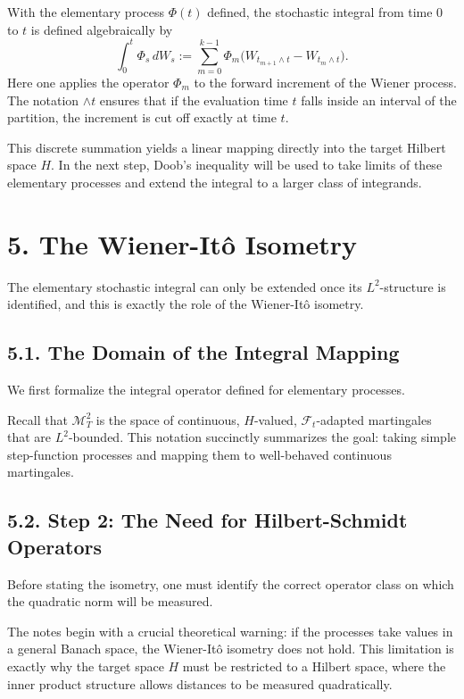 \documentclass[11pt]{article}
\theoremstyle{definition}
\theoremstyle{remark}
\begin{document}
With the elementary process \(\Phi(t)\) defined, the stochastic integral from time \(0\) to \(t\) is defined algebraically by
\[
\int_0^t \Phi_s\,dW_s
:=
\sum_{m=0}^{k-1}\Phi_m\bigl(W_{t_{m+1}\wedge t}-W_{t_m\wedge t}\bigr).
\]
Here one applies the operator \(\Phi_m\) to the forward increment of the Wiener process. The notation \(\wedge t\) ensures that if the evaluation time \(t\) falls inside an interval of the partition, the increment is cut off exactly at time \(t\).

This discrete summation yields a linear mapping directly into the target Hilbert space \(H\). In the next step, Doob's inequality will be used to take limits of these elementary processes and extend the integral to a larger class of integrands.

\section*{5. The Wiener-It\^o Isometry}
The elementary stochastic integral can only be extended once its \(L^2\)-structure is identified, and this is exactly the role of the Wiener-It\^o isometry.

\subsection*{5.1. The Domain of the Integral Mapping}
We first formalize the integral operator defined for elementary processes.

Recall that \(\mathcal M_T^2\) is the space of continuous, \(H\)-valued, \(\mathcal F_t\)-adapted martingales that are \(L^2\)-bounded. This notation succinctly summarizes the goal: taking simple step-function processes and mapping them to well-behaved continuous martingales.

\subsection*{5.2. Step 2: The Need for Hilbert-Schmidt Operators}
Before stating the isometry, one must identify the correct operator class on which the quadratic norm will be measured.

The notes begin with a crucial theoretical warning: if the processes take values in a general Banach space, the Wiener-It\^o isometry does not hold. This limitation is exactly why the target space \(H\) must be restricted to a Hilbert space, where the inner product structure allows distances to be measured quadratically.
\end{document}
